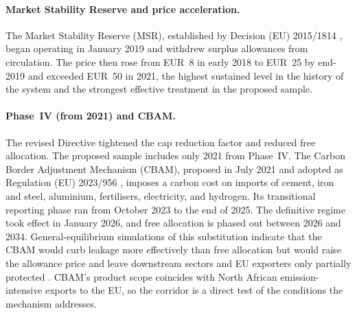 \paragraph{Market Stability Reserve and price acceleration.}
The Market Stability Reserve (MSR), established by Decision (EU) 2015/1814 \citep{msr2015}, began operating in January 2019 and withdrew surplus allowances from circulation. The price then rose from EUR~8 in early 2018 to EUR~25 by end-2019 and exceeded EUR~50 in 2021, the highest sustained level in the history of the system and the strongest effective treatment in the proposed sample.

\paragraph{Phase~IV (from 2021) and CBAM.}
The revised Directive tightened the cap reduction factor and reduced free allocation. The proposed sample includes only 2021 from Phase~IV. The Carbon Border Adjustment Mechanism (CBAM), proposed in July 2021 and adopted as Regulation (EU) 2023/956 \citep{cbam2023}, imposes a carbon cost on imports of cement, iron and steel, aluminium, fertilisers, electricity, and hydrogen. Its transitional reporting phase ran from October 2023 to the end of 2025. The definitive regime took effect in January 2026, and free allocation is phased out between 2026 and 2034. General-equilibrium simulations of this substitution indicate that the CBAM would curb leakage more effectively than free allocation but would raise the allowance price and leave downstream sectors and EU exporters only partially protected \citep{bellora2023}. CBAM's product scope coincides with North African emission-intensive exports to the EU, so the corridor is a direct test of the conditions the mechanism addresses.

